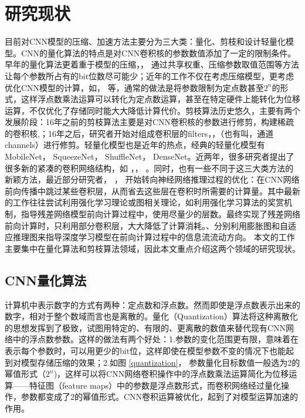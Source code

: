\documentclass[ pdftex, oneside, master]{NJUthesis}
\begin{document}
\section{研究现状}
目前对CNN模型的压缩、加速方法主要分为三大类：量化、剪枝和设计轻量化模型。CNN的量化算法的特点是对CNN卷积核的参数数值添加了一定的限制条件。早年的量化算法更着重于模型的压缩，\cite{earlycompression1}， \cite{earlycompression2}通过共享权重、压缩参数取值范围等方法让每个参数所占有的bit位数尽可能少；近年的工作不仅在考虑压缩模型，更考虑优化CNN模型的计算，如\cite{quantization}， \cite{incremental}等，通常的做法是将参数限制为定点数甚至$2^n$的形式，这样浮点数乘法运算可以转化为定点数运算，甚至在特定硬件上能转化为位移运算，不仅优化了存储同时能大大降低计算代价。剪枝算法历史悠久，主要有两个发展阶段：16年之前的剪枝算法主要是对CNN卷积核的参数进行修剪，构建稀疏的卷积核\cite{hanson1988},\cite{skinny}；16年之后，研究者开始对组成卷积层\cite{coarse}的filters\cite{LDA}，\cite{2019iclr}，\cite{2018iclr}（也有叫，通道channels）进行修剪。轻量化模型也是近年的热点，经典的轻量化模型有MobileNet\cite{mobilenet}， SqueezeNet\cite{squeezenet}， ShuffleNet\cite{shufflenet}， DenseNet\cite{densenet}。近两年，很多研究者提出了很多新的紧凑的卷积网络结构，如 \cite{cvprq73}，\cite{mec}， \cite{icmlq84}。同时，也有一些不同于这三大类方法的新颖方法，最近部分研究者\cite{cvprq72}， \cite{icmlq73}， \cite{cvprq83}开始转向神经网络推理过程的优化：在CNN网络前向传播中跳过某些卷积层，从而省去这些层在卷积时所需要的计算量。其中最新的工作往往尝试利用强化学习理论或图相关理论，如\cite{cvprq83}利用强化学习算法的奖赏机制，指导残差网络模型前向计算过程中，使用尽量少的层数。最终\cite{cvprq83}实现了残差网络前向计算时，只利用部分卷积层，大大降低了计算消耗。\cite{eccvq86}、\cite{eccvq89}分别利用膨胀图和自适应推理图来指导深度学习模型在前向计算过程中的信息流流动方向。
本文的工作主要集中在量化算法和剪枝算法领域，因此本文重点介绍这两个领域的研究现状。

\subsection{CNN量化算法}

计算机中表示数字的方式有两种：定点数和浮点数。然而即使是浮点数表示出来的数字，相对于整个数域而言也是离散的。量化（Quantization）算法将这种离散化的思想发挥到了极致，试图用特定的、有限的、更离散的数值来替代现有CNN网络中的浮点数参数。这样的做法有两个好处：1.参数的变化范围更有限，意味着在表示每个参数时，可以用更少的bit位，这样即使在模型参数不变的情况下也能起到对模型存储压缩的效果；2.如图 \ref{quantization}， 参数量化目标数值一般选为2的幂值形式（$2^n$)，这样可以将CNN网络卷积操作中的浮点数乘法运算简化为位移运算——特征图（feature maps）中的参数是浮点数形式，而卷积网络经过量化操作，参数都变成了2的幂值形式。CNN卷积运算被优化，起到了对模型运算加速的作用。
\end{document}
